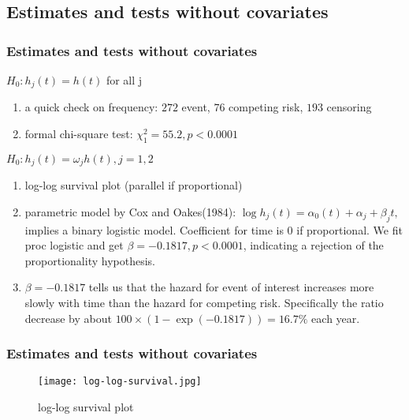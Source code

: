 \documentclass{beamer}[10]
\begin{document}
\subsection{Estimates and tests without covariates}
\begin{frame}
	\frametitle{Estimates and tests without covariates}
	$H_0: h_j(t) = h(t)$ for all j
		\begin{enumerate}
			\item a quick check on frequency: $272$ event, $76$ competing risk, $193$ censoring
			\item formal chi-square test: $\chi^2_1 = 55.2, p < 0.0001$
		\end{enumerate}
    $H_0: h_j(t) = \omega_j h(t), j = 1, 2$
		\begin{enumerate}
			\item log-log survival plot (parallel if proportional)
			\item parametric model by Cox and Oakes(1984):
			 $\log h_j(t) = \alpha_0(t) + \alpha_j + \beta_j t,$ implies a binary logistic model. Coefficient for time is $0$ if proportional. We fit proc logistic and get $\beta = -0.1817, p < 0.0001$, indicating a rejection of the proportionality hypothesis.
			 \item $\beta = -0.1817$ tells us that the hazard for event of interest increases more slowly with time than the hazard for competing risk. Specifically the ratio decrease by about $100\times (1 - \exp(-0.1817)) = 16.7\%$ each year.
		\end{enumerate}
\end{frame}
\begin{frame}
	\frametitle{Estimates and tests without covariates}
	\begin{figure}[t]
	\begin{center}
		\caption{log-log survival plot}\label{log-log}
		\texttt{[image: log-log-survival.jpg]}
	\end{center}
\end{figure}
\end{frame}
\end{document}

